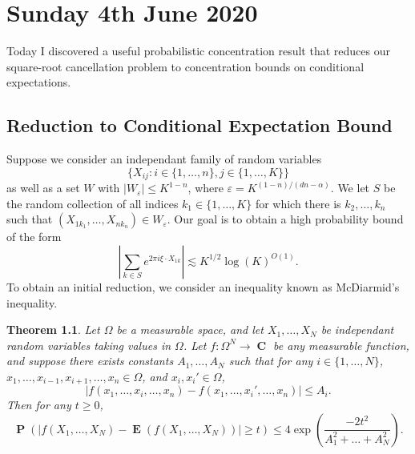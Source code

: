 \documentclass[openany,nobib,nols,a4paper,twoside,symmetric,justified,notoc]{tufte-book}
\theoremstyle{plain}
\newtheorem{theorem}{Theorem}[chapter]
\theoremstyle{remark}
\theoremstyle{definition}
\DeclareMathOperator{\CC}{\mathbf{C}}
\DeclareMathOperator{\EE}{\mathbf{E}}
\DeclareMathOperator{\PP}{\mathbf{P}}
\begin{document}
\chapter{Sunday 4th June 2020} \label{04062020}

Today I discovered a useful probabilistic concentration result that reduces our square-root cancellation problem to concentration bounds on conditional expectations.

\section{Reduction to Conditional Expectation Bound}

Suppose we consider an independant family of random variables
%
\[ \{ X_{ij}: i \in \{ 1, \dots, n \}, j \in \{ 1, \dots, K \} \} \]
%
as well as a set $W$ with $|W_\varepsilon| \leq K^{1-n}$, where $\varepsilon = K^{(1 - n)/(dn - \alpha)}$. We let $S$ be the random collection of all indices $k_1 \in \{ 1, \dots, K \}$ for which there is $k_2, \dots, k_n$ such that $(X_{1 k_1}, \dots, X_{nk_n}) \in W_\varepsilon$. Our goal is to obtain a high probability bound of the form
%
\[ \left| \sum_{k \in S} e^{2 \pi i \xi \cdot X_{1k}} \right| \lesssim K^{1/2} \log(K)^{O(1)}. \]
%
To obtain an initial reduction, we consider an inequality known as McDiarmid's inequality.

\begin{theorem}
    Let $\Omega$ be a measurable space, and let $X_1, \dots, X_N$ be independant random variables taking values in $\Omega$. Let $f: \Omega^N \to \CC$ be any measurable function, and suppose there exists constants $A_1, \dots, A_N$ such that for any $i \in \{ 1, \dots, N \}$, $x_1, \dots, x_{i-1}, x_{i+1}, \dots, x_n \in \Omega$, and $x_i, x_i' \in \Omega$,
    \[ |f(x_1,\dots,x_i,\dots,x_n) - f(x_1,\dots,x_i',\dots,x_n)| \leq A_i. \]
    Then for any $t \geq 0$,
    \[ \PP \left( |f(X_1,\dots,X_N) - \EE(f(X_1,\dots,X_N))| \geq t \right) \leq 4 \exp \left( \frac{-2t^2}{A_1^2 + \dots + A_N^2} \right). \]
\end{theorem}
\end{document}
